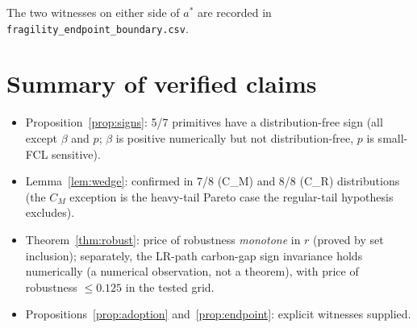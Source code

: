\documentclass[11pt]{article}
\begin{document}
The two witnesses on either side of $a^\ast$ are recorded in
\texttt{fragility\_endpoint\_boundary.csv}.

\section*{Summary of verified claims}
\begin{itemize}
\item Proposition~\ref{prop:signs}: 5/7 primitives have a distribution-free
sign (all except $\beta$ and $p$; $\beta$ is positive numerically but not
distribution-free, $p$ is small-FCL sensitive).
\item Lemma~\ref{lem:wedge}: confirmed in 7/8 (C\_M) and 8/8 (C\_R) distributions
(the $C_M$ exception is the heavy-tail Pareto case the regular-tail hypothesis excludes).
\item Theorem~\ref{thm:robust}: price of robustness \emph{monotone} in $r$ (proved by
set inclusion); separately, the LR-path carbon-gap sign invariance holds numerically
(a numerical observation, not a theorem), with price of robustness $\le 0.125$ in the tested grid.
\item Propositions~\ref{prop:adoption} and~\ref{prop:endpoint}: explicit
witnesses supplied.
\end{itemize}
\end{document}
